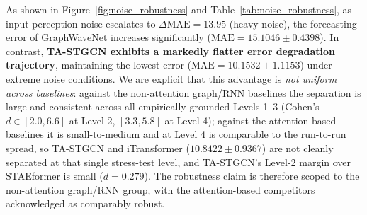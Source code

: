 \documentclass[journal,twocolumn]{IEEEtran}
\begin{document}
\begin{table}[htbp]
\centering
\caption{Performance Degradation (Forecasting MAE Overall) Under Simulated Stage 1 Perception Noise Levels ($\text{Mean} \pm \text{Std}$).}
\label{tab:noise_robustness}
\end{table}

As shown in Figure~\ref{fig:noise_robustness} and Table~\ref{tab:noise_robustness}, as input perception noise escalates to $\Delta \text{MAE} = 13.95$ (heavy noise), the forecasting error of GraphWaveNet increases significantly ($\text{MAE} = 15.1046 \pm 0.4398$). In contrast, \textbf{TA-STGCN exhibits a markedly flatter error degradation trajectory}, maintaining the lowest error ($\text{MAE} = 10.1532 \pm 1.1153$) under extreme noise conditions. We are explicit that this advantage is \emph{not uniform across baselines}: against the non-attention graph/RNN baselines the separation is large and consistent across all empirically grounded Levels 1--3 (Cohen's $d \in [2.0, 6.6]$ at Level 2, $[3.3, 5.8]$ at Level 4); against the attention-based baselines it is small-to-medium and at Level 4 is comparable to the run-to-run spread, so TA-STGCN and iTransformer ($10.8422 \pm 0.9367$) are not cleanly separated at that single stress-test level, and TA-STGCN's Level-2 margin over STAEformer is small ($d = 0.279$). The robustness claim is therefore scoped to the non-attention graph/RNN group, with the attention-based competitors acknowledged as comparably robust.
\end{document}
